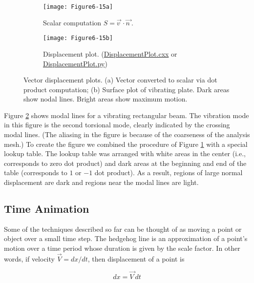 \begin{figure}[htb]
	\begin{subfigure}[h]{0.48\linewidth}
		\texttt{[image: Figure6-15a]}
		\caption{Scalar computation $S = \overrightarrow{v\ } \cdot \overrightarrow{n\ }$.}\label{fig:Figure6-15a}
	\end{subfigure}
	\hfill
	\begin{subfigure}[h]{0.48\linewidth}
		\texttt{[image: Figure6-15b]}
		\caption{Displacement plot. (\href{https://lorensen.github.io/VTKExamples/site/Cxx/VisualizationAlgorithms/DisplacementPlot}{DisplacementPlot.cxx} or \href{https://lorensen.github.io/VTKExamples/site/Python/VisualizationAlgorithms/DisplacementPlot/}{DisplacementPlot.py})}\label{fig:Figure6-15b}
	\end{subfigure}
	\caption{Vector displacement plots. (a) Vector converted to scalar via dot product computation; (b) Surface plot of vibrating plate. Dark areas show nodal lines. Bright areas show maximum motion.}\label{fig:Figure6-15}
\end{figure}

Figure \ref{fig:Figure6-15b}  shows modal lines for a vibrating rectangular beam. The vibration mode in this figure is the second torsional mode, clearly indicated by the crossing modal lines. (The aliasing in the figure is because of the coarseness of the analysis mesh.) To create the figure we combined the procedure of Figure \ref{fig:Figure6-15a}  with a special lookup table. The lookup table was arranged with white areas in the center (i.e., corresponds to zero dot product) and dark areas at the beginning and end of the table (corresponds to $1$ or $-1$ dot product). As a result, regions of large normal displacement are dark and regions near the modal lines are light.

\subsection{Time Animation}

Some of the techniques described so far can be thought of as moving a point or object over a small time step. The hedgehog line is an approximation of a point's motion over a time period whose duration is given by the scale factor. In other words, if velocity $\vec{V} = dx/dt$, then displacement of a point is

\begin{equation}\label{eq:6.1}
dx = \overrightarrow{V\ }dt
\end{equation}

